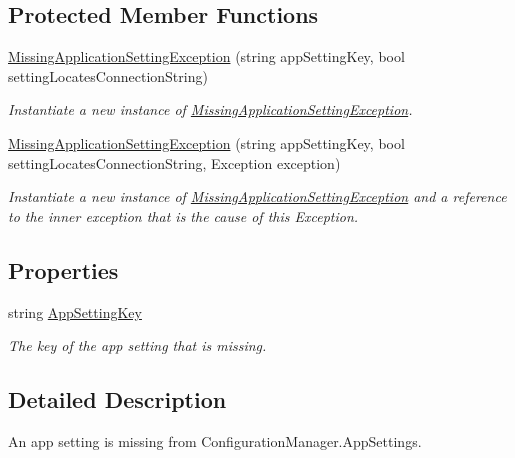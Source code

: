 \subsection*{Protected Member Functions}
\begin{DoxyCompactItemize}
\item 
\hyperlink{classCqrs_1_1Exceptions_1_1MissingApplicationSettingException_a3844f3cca66b51fad93746b0e9220786_a3844f3cca66b51fad93746b0e9220786}{Missing\+Application\+Setting\+Exception} (string app\+Setting\+Key, bool setting\+Locates\+Connection\+String)
\begin{DoxyCompactList}\small\item\em Instantiate a new instance of \hyperlink{classCqrs_1_1Exceptions_1_1MissingApplicationSettingException}{Missing\+Application\+Setting\+Exception}. \end{DoxyCompactList}\item 
\hyperlink{classCqrs_1_1Exceptions_1_1MissingApplicationSettingException_a716df17e333c4d4360bf235fb3a4dc7e_a716df17e333c4d4360bf235fb3a4dc7e}{Missing\+Application\+Setting\+Exception} (string app\+Setting\+Key, bool setting\+Locates\+Connection\+String, Exception exception)
\begin{DoxyCompactList}\small\item\em Instantiate a new instance of \hyperlink{classCqrs_1_1Exceptions_1_1MissingApplicationSettingException}{Missing\+Application\+Setting\+Exception} and a reference to the inner {\itshape exception}  that is the cause of this Exception. \end{DoxyCompactList}\end{DoxyCompactItemize}
\subsection*{Properties}
\begin{DoxyCompactItemize}
\item 
string \hyperlink{classCqrs_1_1Exceptions_1_1MissingApplicationSettingException_a7ffd358d3181b5917021f76f6441ea28_a7ffd358d3181b5917021f76f6441ea28}{App\+Setting\+Key}
\begin{DoxyCompactList}\small\item\em The key of the app setting that is missing. \end{DoxyCompactList}\end{DoxyCompactItemize}


\subsection{Detailed Description}
An app setting is missing from Configuration\+Manager.\+App\+Settings. 




